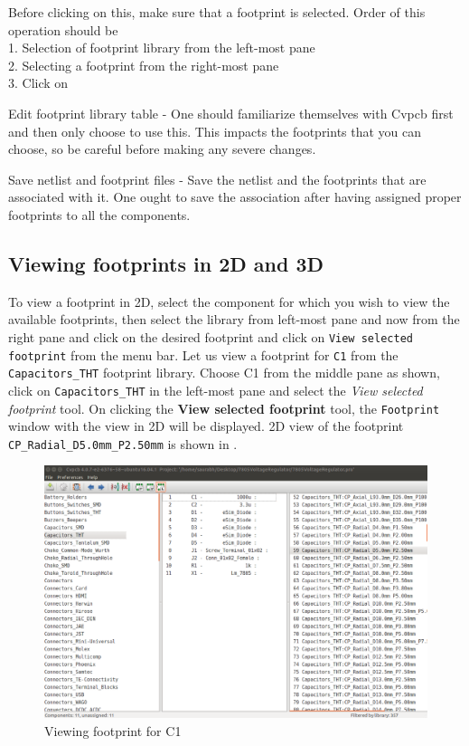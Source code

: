 \begin{compactenum}
  Before clicking on this, make sure that a footprint is selected. Order of this operation should be
  \\ 1. Selection of footprint library from the left-most pane 
  \\ 2. Selecting a footprint from the right-most pane
  \\ 3. Click on 
\item Edit footprint library table - One should familiarize themselves with Cvpcb first and then only choose to use this. This impacts the footprints that you can choose, so be careful before making any severe changes.
\item Save netlist and footprint files - Save the netlist and the
  footprints that are associated with it. One ought to save the association after having assigned proper footprints to all the components.
\end{compactenum}

\subsection{Viewing footprints in 2D and 3D}
\label{viewfp}
\item To view a footprint in 2D, select the component for which you wish to view the available footprints, then select the library from left-most pane and now from the right pane and click on the desired footprint and click on \texttt{View selected footprint} from the menu bar. 
Let us view a footprint for \texttt{C1} from the \texttt{Capacitors\_THT} footprint library. Choose C1 from the middle pane as shown, click on \texttt{Capacitors\_THT} in the left-most pane and select the  
\textit{View selected footprint} tool.
On clicking the \textbf{View selected footprint} tool, the {\tt Footprint} window with the view in 2D will be displayed. 2D view of the footprint \texttt{CP\_Radial\_D5.0mm\_P2.50mm} is shown in .

\begin{figure}
\centering
\includegraphics[width=\lgfig]{smnew.png}
\caption{Viewing footprint for C1}
\label{sm}
\end{figure}

